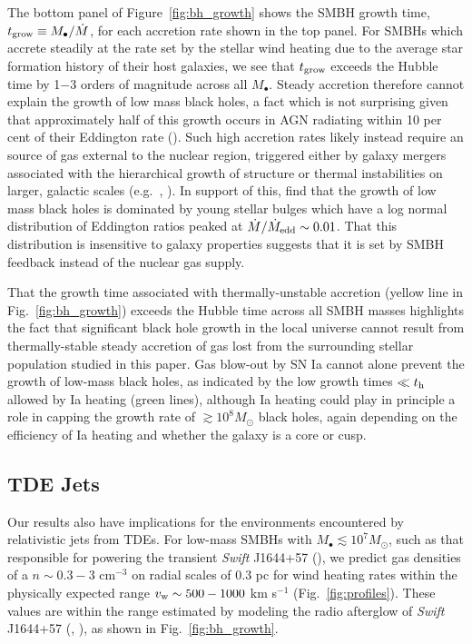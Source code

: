 \documentclass[usenatbib,fleqn]{mn2e}
\newcommand{\Mdot}{\dot{M}}
\begin{document}
The bottom panel of Figure~\ref{fig:bh_growth} shows the SMBH growth
time, $t_{\rm grow} \equiv M_{\bullet}/\dot{M}$, for each accretion
rate shown in the top panel.  For SMBHs which accrete steadily at the
rate set by the stellar wind heating due to the average star formation
history of their host galaxies, we see that $t_{\rm grow}$ exceeds the
Hubble time by 1$-$3 orders of magnitude across all $M_{\bullet}$.
Steady accretion therefore cannot explain the growth of low mass black
holes, a fact which is not surprising given that approximately half of
this growth occurs in AGN radiating within 10 per cent of their
Eddington rate (\citealt{Heckman+04}).  Such high accretion rates
likely instead require an source of gas external to the nuclear
region, triggered either by galaxy mergers associated with the
hierarchical growth of structure or thermal instabilities on larger,
galactic scales (e.g.~\citealt{Ciotti+10}, \citealt{Voit+15}).  In
support of this, \citet{Kauffmann&Heckman09} find that the growth of
low mass black holes is dominated by young stellar bulges which have a
log normal distribution of Eddington ratios peaked at
$\Mdot/\dot{M}_{\rm edd} \sim 0.01$. That this distribution is
insensitive to galaxy properties suggests that it is set by SMBH
feedback instead of the nuclear gas supply.

That the growth time associated with thermally-unstable accretion
(yellow line in Fig.~\ref{fig:bh_growth}) exceeds the Hubble time across all SMBH masses
highlights the fact that significant black hole growth in the local
universe cannot result from thermally-stable steady accretion of gas
lost from the surrounding stellar population studied in this paper.
Gas blow-out by SN Ia cannot alone prevent the growth of low-mass black
holes, as indicated by the low growth times $\ll t_{\rm h}$ allowed by
Ia heating (green lines), although Ia heating could play in principle
a role in capping the growth rate of $\gtrsim 10^{8}M_{\odot}$ black
holes, again depending on the efficiency of Ia heating and whether the
galaxy is a core or cusp.


\subsection{TDE Jets}
\label{sec:TDE}

Our results also have implications for the environments encountered by
relativistic jets from TDEs.  For low-mass SMBHs with $M_{\bullet} \lesssim
10^{7}M_{\odot}$, such as that responsible for powering the transient {\it Swift}
J1644+57 (\citealt{Bloom+11}), we predict gas densities of a $n
\sim 0.3-3$ cm$^{-3}$ on radial scales of 0.3 pc for wind heating
rates within the physically expected range $v_{\rm w} \sim 500-1000$
km s$^{-1}$ (Fig.~\ref{fig:profiles}).  These values are within the
range estimated by modeling the radio afterglow of {\it Swift}
J1644+57 (\citealt{Metzger+12}, \citealt{BergerZauderer+:2012a}), as shown in Fig.~\ref{fig:bh_growth}.
\end{document}
